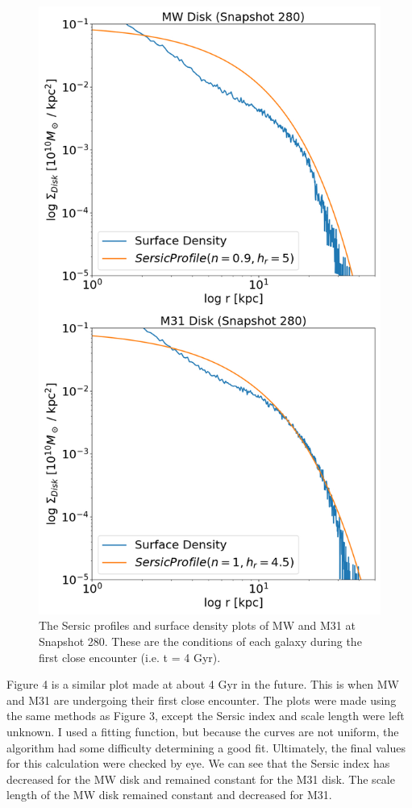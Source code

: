 \documentclass[linenumbers,trackchanges,twocolumn]{aastex7}
\begin{document}
\begin{figure}[h!]
\centering
\includegraphics[scale=0.2]{ResultsV_280.jpg}
\caption{The Sersic profiles and surface density plots of MW and M31 at Snapshot 280. These are the conditions of each galaxy during the first close encounter (i.e. t = 4 Gyr).
\label{fig:general}}
\end{figure}

Figure 4 is a similar plot made at about 4 Gyr in the future. This is
when MW and M31 are undergoing their first close encounter. The plots
were made using the same methods as Figure 3, except the Sersic index and scale length were left unknown. I used a fitting function, but because the curves are not uniform, the algorithm had some difficulty determining a good fit. Ultimately, the final values for this calculation were checked by eye. We can see that the
Sersic index has decreased for the MW disk and remained constant for the M31 disk. The scale length of the MW disk remained constant and decreased
for M31.
\end{document}
